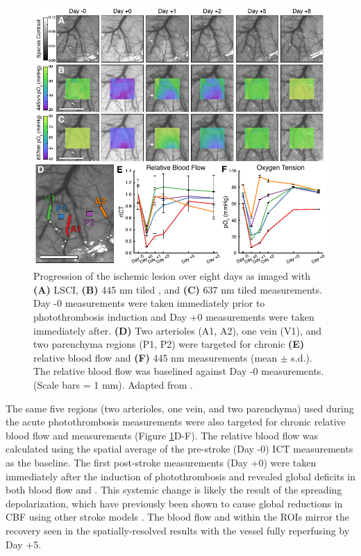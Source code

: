 \begin{figure}
    \includegraphics{figures/chapter_3/photothrombosischronic.pdf}
    \caption[Chronic measurements of the recovery in blood flow and  following targeted photothrombosis.]{
        \label{fig:photothrombosischronic}
        Progression of the ischemic lesion over eight days as imaged with \textbf{(A)} LSCI, \textbf{(B)} 445 nm tiled , and \textbf{(C)} 637 nm tiled  measurements. Day -0 measurements were taken immediately prior to photothrombosis induction and Day +0 measurements were taken immediately after. \textbf{(D)} Two arterioles (A1, A2), one vein (V1), and two parenchyma regions (P1, P2) were targeted for chronic \textbf{(E)} relative blood flow and \textbf{(F)} 445 nm  measurements (mean $\pm$ s.d.). The relative blood flow was baselined against Day -0 measurements. (Scale bars = 1 mm). Adapted from \cite{Sullender:2018ff}.
    }
\end{figure}

The same five regions (two arterioles, one vein, and two parenchyma) used during the acute photothrombosis measurements were also targeted for chronic relative blood flow and  measurements (Figure \ref{fig:photothrombosischronic}D-F). The relative blood flow was calculated using the spatial average of the pre-stroke (Day -0) ICT measurements as the baseline. The first post-stroke measurements (Day +0) were taken immediately after the induction of photothrombosis and revealed global deficits in both blood flow and . This systemic change is likely the result of the spreading depolarization, which have previously been shown to cause global reductions in CBF using other stroke models \cite{Shin:2006dc, Nakamura:2010wp}. The blood flow and  within the ROIs mirror the recovery seen in the spatially-resolved results with the vessel fully reperfusing by Day +5.

